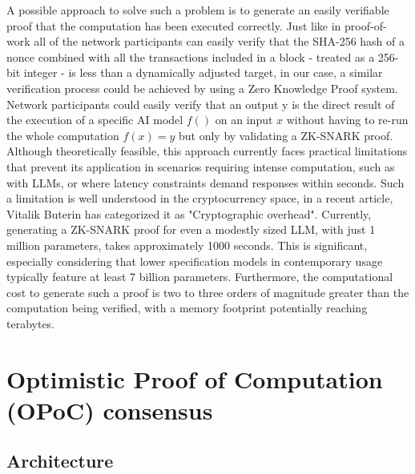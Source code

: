 \documentclass{article}
\begin{document}
A possible approach to solve such a problem is to generate an easily verifiable proof that the computation has been executed correctly. Just like in proof-of-work all of the network participants can easily verify that the SHA-256 hash of a nonce combined with all the transactions included in a block - treated as a 256-bit integer - is less than a dynamically adjusted target, in our case, a similar verification process could be achieved by using a Zero Knowledge Proof system. Network participants could easily verify that an output y is the direct result of the execution of a specific AI model \( f() \) on an input \( x \) without having to re-run the whole computation \( f(x) = y \) but only by validating a ZK-SNARK proof. Although theoretically feasible, this approach currently faces practical limitations that prevent its application in scenarios requiring intense computation, such as with LLMs, or where latency constraints demand responses within seconds. Such a limitation is well understood in the cryptocurrency space, in a recent article, Vitalik Buterin has categorized it as "Cryptographic overhead".
Currently, generating a ZK-SNARK proof for even a modestly sized LLM, with just 1 million parameters, takes approximately 1000 seconds. This is significant, especially considering that lower specification models in contemporary usage typically feature at least 7 billion parameters. Furthermore, the computational cost to generate such a proof is two to three orders of magnitude greater than the computation being verified, with a memory footprint potentially reaching terabytes.



\section{Optimistic Proof of Computation (OPoC) consensus 
}

\subsection{Architecture}
\end{document}
